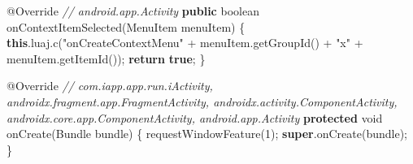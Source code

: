 \documentclass[
]{article}
\newenvironment{Shaded}{}{}
\newcommand{\AttributeTok}[1]{\textcolor[rgb]{0.49,0.56,0.16}{#1}}
\newcommand{\BuiltInTok}[1]{\textcolor[rgb]{0.00,0.50,0.00}{#1}}
\newcommand{\CommentTok}[1]{\textcolor[rgb]{0.38,0.63,0.69}{\textit{#1}}}
\newcommand{\ControlFlowTok}[1]{\textcolor[rgb]{0.00,0.44,0.13}{\textbf{#1}}}
\newcommand{\DataTypeTok}[1]{\textcolor[rgb]{0.56,0.13,0.00}{#1}}
\newcommand{\DecValTok}[1]{\textcolor[rgb]{0.25,0.63,0.44}{#1}}
\newcommand{\FunctionTok}[1]{\textcolor[rgb]{0.02,0.16,0.49}{#1}}
\newcommand{\KeywordTok}[1]{\textcolor[rgb]{0.00,0.44,0.13}{\textbf{#1}}}
\newcommand{\NormalTok}[1]{#1}
\newcommand{\OperatorTok}[1]{\textcolor[rgb]{0.40,0.40,0.40}{#1}}
\newcommand{\StringTok}[1]{\textcolor[rgb]{0.25,0.44,0.63}{#1}}
\begin{document}
\begin{Shaded}
\begin{Highlighting}[]
    \AttributeTok{@Override} \CommentTok{// android.app.Activity}
    \KeywordTok{public} \DataTypeTok{boolean} \FunctionTok{onContextItemSelected}\OperatorTok{(}\BuiltInTok{MenuItem}\NormalTok{ menuItem}\OperatorTok{)} \OperatorTok{\{}
        \KeywordTok{this}\OperatorTok{.}\FunctionTok{luaj}\OperatorTok{.}\FunctionTok{c}\OperatorTok{(}\StringTok{"onCreateContextMenu"} \OperatorTok{+}\NormalTok{ menuItem}\OperatorTok{.}\FunctionTok{getGroupId}\OperatorTok{()} \OperatorTok{+} \StringTok{"x"} \OperatorTok{+}\NormalTok{ menuItem}\OperatorTok{.}\FunctionTok{getItemId}\OperatorTok{());}
        \ControlFlowTok{return} \KeywordTok{true}\OperatorTok{;}
    \OperatorTok{\}}

    \AttributeTok{@Override} \CommentTok{// com.iapp.app.run.iActivity, androidx.fragment.app.FragmentActivity, androidx.activity.ComponentActivity, androidx.core.app.ComponentActivity, android.app.Activity}
    \KeywordTok{protected} \DataTypeTok{void} \FunctionTok{onCreate}\OperatorTok{(}\NormalTok{Bundle bundle}\OperatorTok{)} \OperatorTok{\{}
        \FunctionTok{requestWindowFeature}\OperatorTok{(}\DecValTok{1}\OperatorTok{);}
        \KeywordTok{super}\OperatorTok{.}\FunctionTok{onCreate}\OperatorTok{(}\NormalTok{bundle}\OperatorTok{);}
    \OperatorTok{\}}


\end{Highlighting}
\end{Shaded}
\end{document}
